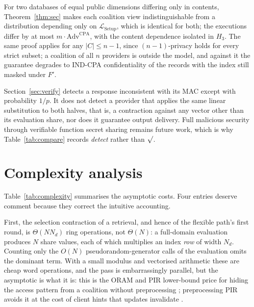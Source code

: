 \documentclass[a4paper,fleqn]{cas-sc}
\providecommand{\checkmark}{\ensuremath{\surd}}
\newcommand{\Leak}{\mathcal{L}}
\begin{document}
\begin{remark}
For two databases of equal public dimensions differing only in contents,
Theorem~\ref{thm:sec} makes each coalition view indistinguishable from a
distribution depending only on $\Leak_{\mathrm{Setup}}$, which is identical
for both; the executions differ by at most $m\cdot\mathrm{Adv}^{\mathrm{CPA}}$,
with the content dependence isolated in $H_3$. The same proof applies for any
$|C|\le n-1$, since $(n{-}1)$-privacy holds for every strict subset; a
coalition of all $n$ providers is outside the model, and against it the
guarantee degrades to IND-CPA confidentiality of the records with the index
still masked under $F'$.
\end{remark}

\begin{remark}
Section~\ref{sec:verify} detects a response inconsistent with its MAC except
with probability $1/p$. It does not detect a provider that applies the same
linear substitution to both halves, that is, a contraction against any vector
other than its evaluation share, nor does it guarantee output delivery. Full
malicious security through verifiable function secret sharing remains future
work, which is why Table~\ref{tab:compare} records \emph{detect} rather than
$\checkmark$.
\end{remark}

\section{Complexity analysis}
\label{sec:complexity}

Table~\ref{tab:complexity} summarises the asymptotic costs. Four entries
deserve comment because they correct the intuitive accounting.

First, the selection contraction of a retrieval, and hence of the flexible
path's first round, is $\Theta(N N_d)$ ring
operations, not $\Theta(N)$: a full-domain evaluation produces $N$ share
values, each of which multiplies an index \emph{row} of width $N_d$. Counting
only the $O(N)$ pseudorandom-generator calls of the evaluation omits the
dominant term. With a small modulus and vectorised arithmetic these are cheap
word operations, and the pass is embarrassingly parallel, but the asymptotic
is what it is: this is the ORAM and PIR lower-bound price for hiding the
access pattern from a coalition without preprocessing
\citep{goldreich1996software,beimel2000reducing}; preprocessing PIR avoids it
at the cost of client hints that updates invalidate
\citep{corrigan2020private}.
\end{document}
